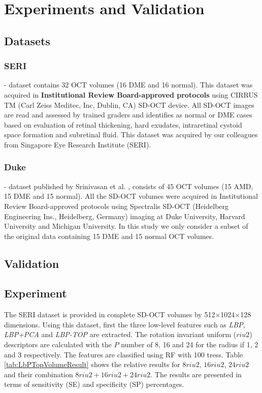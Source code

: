 
\section{Experiments and Validation }
\subsection{Datasets}
\subsubsection{SERI} - dataset contains 32 OCT volumes (16 DME and 16 normal). This dataset was acquired in \textbf{Institutional Review Board-approved protocols} using CIRRUS TM (Carl Zeiss Meditec, Inc, Dublin, CA) SD-OCT device. All SD-OCT images are read and assessed by trained graders and identifies as normal or DME cases based on evaluation of retinal thickening, hard exudates, intraretinal cystoid space formation and subretinal fluid. This dataset was acquired by our colleagues from Singapore Eye Research Institute (SERI). 

\subsubsection{Duke} - dataset published by Srinivasan et al. \cite{Srinivasan2014}, consists of 45 OCT volumes (15 AMD, 15 DME and 15 normal). All the SD-OCT volumes were acquired in Institutional Review Board-approved protocols using Spectralis SD-OCT (Heidelberg Engineering Ins., Heidelberg, Germany) imaging at Duke University, Harvard University and Michigan University. In this study we only consider a subset of the original data containing 15 DME and 15 normal OCT volumes.

\subsection{Validation}

\subsection{Experiment}
The SERI dataset is provided in complete SD-OCT volumes by 512$\times$1024$\times$128 dimensions. Using this dataset, first the three low-level features such as \textit{LBP}, \textit{LBP+PCA} and \textit{LBP-TOP} are extracted. The rotation invariant uniform ($riu2$) descriptors are calculated with the $P$ number of 8, 16 and 24 for the radius if 1, 2 and 3 respectively. The features are classified using RF with 100 tress. Table \ref{tab:LbPTopVolumeResult} shows the relative results for $8riu2$, $16riu2$, $24riu2$ and their combination $8riu2 + 16riu2 + 24riu2$. The results are presented in terms of sensitivity (SE) and specificity (SP) percentages.  

